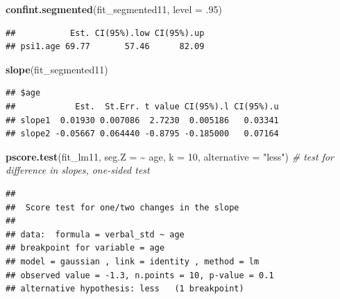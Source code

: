 \documentclass[
]{article}
\newenvironment{Shaded}{\begin{snugshade}}{\end{snugshade}}
\newcommand{\AttributeTok}[1]{\textcolor[rgb]{0.13,0.29,0.53}{#1}}
\newcommand{\CommentTok}[1]{\textcolor[rgb]{0.56,0.35,0.01}{\textit{#1}}}
\newcommand{\DecValTok}[1]{\textcolor[rgb]{0.00,0.00,0.81}{#1}}
\newcommand{\FunctionTok}[1]{\textcolor[rgb]{0.13,0.29,0.53}{\textbf{#1}}}
\newcommand{\NormalTok}[1]{#1}
\newcommand{\SpecialCharTok}[1]{\textcolor[rgb]{0.81,0.36,0.00}{\textbf{#1}}}
\newcommand{\StringTok}[1]{\textcolor[rgb]{0.31,0.60,0.02}{#1}}
\begin{document}
\begin{Shaded}
\begin{Highlighting}[]
\FunctionTok{confint.segmented}\NormalTok{(fit\_segmented11, }\AttributeTok{level =}\NormalTok{ .}\DecValTok{95}\NormalTok{)}
\end{Highlighting}
\end{Shaded}

\begin{verbatim}
##           Est. CI(95%).low CI(95%).up
## psi1.age 69.77       57.46      82.09
\end{verbatim}

\begin{Shaded}
\begin{Highlighting}[]
\FunctionTok{slope}\NormalTok{(fit\_segmented11)}
\end{Highlighting}
\end{Shaded}

\begin{verbatim}
## $age
##            Est.  St.Err. t value CI(95%).l CI(95%).u
## slope1  0.01930 0.007086  2.7230  0.005186   0.03341
## slope2 -0.05667 0.064440 -0.8795 -0.185000   0.07164
\end{verbatim}

\begin{Shaded}
\begin{Highlighting}[]
\FunctionTok{pscore.test}\NormalTok{(fit\_lm11, }\AttributeTok{seg.Z =} \SpecialCharTok{\textasciitilde{}}\NormalTok{ age, }\AttributeTok{k =} \DecValTok{10}\NormalTok{, }\AttributeTok{alternative =} \StringTok{"less"}\NormalTok{) }\CommentTok{\# test for difference in slopes, one{-}sided test}
\end{Highlighting}
\end{Shaded}

\begin{verbatim}
## 
##  Score test for one/two changes in the slope
## 
## data:  formula = verbal_std ~ age 
## breakpoint for variable = age 
## model = gaussian , link = identity , method = lm
## observed value = -1.3, n.points = 10, p-value = 0.1
## alternative hypothesis: less   (1 breakpoint)
\end{verbatim}
\end{document}
